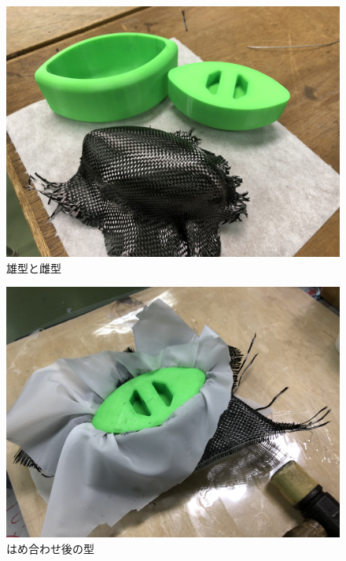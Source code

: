 \begin{figure}[htbp]
  \begin{center}
    \includegraphics[width=120mm]{img/２７.JPG}
    \end{center}
  \caption{雄型と雌型}
 \label{fig:robot}
\end{figure}

\begin{figure}[htbp]
  \begin{center}
    \includegraphics[width=120mm]{img/２８.JPG}
    \end{center}
  \caption{はめ合わせ後の型}
 \label{fig:robot}
\end{figure}


